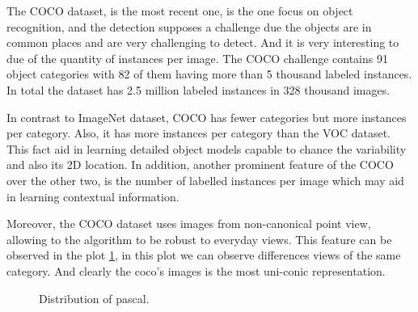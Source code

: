 The COCO dataset, is the most recent one, is the one focus on object recognition, and the detection supposes a challenge due the objects are in common places and are very challenging to detect. And it is very interesting to due of the quantity of instances per image. The COCO challenge contains 91 object categories with 82 of them having more than 5 thousand labeled instances. In total the dataset has 2.5 million labeled instances in 328 thousand images. 

In contrast to ImageNet dataset, COCO has fewer categories but more instances per category. Also, it has more instances per category than the VOC dataset. This fact aid in learning detailed object models capable to chance the variability and also its 2D location. In addition, another prominent feature of the COCO over the other two, is the number of labelled instances per image which may aid in learning contextual information.


Moreover, the COCO dataset uses images from non-canonical point view, allowing to the algorithm to be robust to everyday views. This feature can be observed in the plot \ref{iconic}, in this plot we can observe differences views of the same category. And clearly the coco's images is the most uni-conic representation.

\begin{figure}[H]
		
\centering
{}
\caption{Distribution of pascal.} \label{iconic}

\end{figure}


